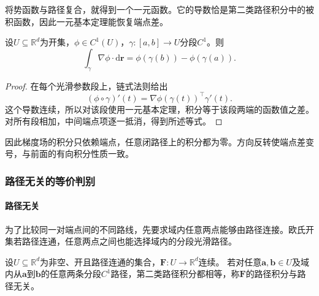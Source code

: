 将势函数与路径复合，就得到一个一元函数。它的导数恰是第二类路径积分中的被积函数，因此一元基本定理能恢复端点差。
\begin{theorem}[路径积分基本定理]
设$U\subseteq\mathbb R^d$为开集，$\phi\in C^1(U)$，$\gamma:[a,b]\to U$分段$C^1$。则
\begin{equation}
  \int_{\gamma}\nabla\phi\mathbin{\cdot}\mathrm{d}\bm{r}
  =\phi(\gamma(b))-\phi(\gamma(a)).
\label{eq:analysis-line-integral-gradient}
\end{equation}
\end{theorem}
\begin{proof}
在每个光滑参数段上，链式法则给出
\[
 (\phi\circ\gamma)'(t)=\nabla\phi(\gamma(t))^\top\gamma'(t).
\]
这个导数连续，所以对该段使用一元基本定理，积分等于该段两端的函数值之差。
对所有段相加，中间端点项逐一抵消，得到所述等式。
\end{proof}

因此梯度场的积分只依赖端点，任意闭路径上的积分都为零。方向反转使端点差变号，与前面的有向积分性质一致。

\subsubsection{路径无关的等价判别}

\paragraph{路径无关}

为了比较同一对端点间的不同路线，先要求域内任意两点能够由路径连接。欧氏开集若路径连通，任意两点之间也能选择域内的分段光滑路径。
\begin{definition}[路径无关]
设$U\subseteq\mathbb R^d$为非空、开且路径连通的集合，$\bm F:U\to\mathbb R^d$连续。
若对任意$\bm a,\bm b\in U$及域内从$\bm a$到$\bm b$的任意两条分段$C^1$路径，第二类路径积分都相等，称$\bm F$的路径积分与路径无关。
\end{definition}


